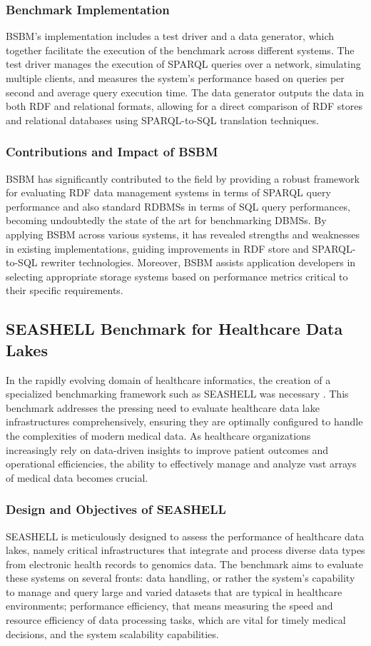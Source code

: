 \subsubsection{Benchmark Implementation}
BSBM's implementation includes a test driver and a data generator, which together facilitate the execution of the benchmark across different systems. The test driver manages the execution of SPARQL queries over a network, simulating multiple clients, and measures the system's performance based on queries per second and average query execution time.
The data generator outputs the data in both RDF and relational formats, allowing for a direct comparison of RDF stores and relational databases using SPARQL-to-SQL translation techniques.
\subsubsection{Contributions and Impact of BSBM}
\ac{BSBM} has significantly contributed to the field by providing a robust framework for evaluating RDF data management systems in terms of SPARQL query performance and also standard RDBMSs in terms of SQL query performances, becoming undoubtedly the state of the art for benchmarking \ac{DBMS}s. By applying \ac{BSBM} across various systems, it has revealed strengths and weaknesses in existing implementations, guiding improvements in RDF store and SPARQL-to-SQL rewriter technologies. Moreover, \ac{BSBM} assists application developers in selecting appropriate storage systems based on performance metrics critical to their specific requirements.

\subsection{SEASHELL Benchmark for Healthcare Data Lakes} 
In the rapidly evolving domain of healthcare informatics, the creation of a specialized benchmarking framework such as \ac{SEASHELL} was necessary \cite{dolci2024tools}. This benchmark addresses the pressing need to evaluate healthcare data lake infrastructures comprehensively, ensuring they are optimally configured to handle the complexities of modern medical data. As healthcare organizations increasingly rely on data-driven insights to improve patient outcomes and operational efficiencies, the ability to effectively manage and analyze vast arrays of medical data becomes crucial.
\subsubsection{Design and Objectives of SEASHELL}
SEASHELL is meticulously designed to assess the performance of healthcare data lakes, namely critical infrastructures that integrate and process diverse data types from electronic health records to genomics data. The benchmark aims to evaluate these systems on several fronts: data handling, or rather the system's capability to manage and query large and varied datasets that are typical in healthcare environments; performance efficiency, that means measuring the speed and resource efficiency of data processing tasks, which are vital for timely medical decisions, and the system scalability capabilities.
